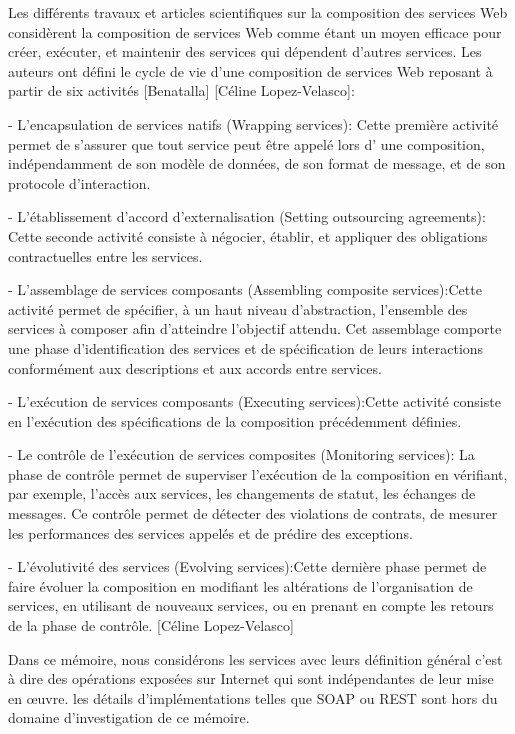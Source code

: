 Les différents travaux et articles scientifiques sur la composition des services Web considèrent la composition de services Web comme étant un moyen efficace 
pour créer, exécuter, et maintenir des services qui dépendent d’autres services. Les auteurs ont défini le cycle de vie d’une composition de services Web reposant à partir de six activités [Benatalla] [Céline Lopez-Velasco]: 

- L’encapsulation de services natifs (Wrapping services): Cette première activité permet de  s’assurer que tout service peut être appelé lors d’ une composition, indépendamment de son  modèle de données, de son format de message, et de son protocole d’interaction. 


- L’établissement d’accord d’externalisation (Setting outsourcing agreements): Cette seconde activité consiste à négocier, établir, et appliquer des obligations contractuelles entre les services.


- L’assemblage de services composants (Assembling composite services):Cette activité permet  de spécifier, à un haut niveau d’abstraction, l’ensemble des services à composer afin d’atteindre  l’objectif attendu. Cet assemblage comporte une phase d’identification des services et de spécification de leurs interactions conformément aux descriptions et aux accords entre services. 


- L’exécution de services composants (Executing services):Cette activité consiste en l’exécution des spécifications de la composition précédemment définies. 


- Le contrôle de l’exécution de services composites (Monitoring services): La phase de contrôle permet de superviser l’exécution de la composition en vérifiant, par exemple, l’accès aux services, les changements de statut, les échanges de messages. Ce contrôle permet de détecter des violations de contrats, de mesurer les performances des services appelés et de prédire des exceptions. 


- L’évolutivité des services (Evolving services):Cette dernière phase permet de faire évoluer la composition en modifiant les altérations de l’organisation de services, en utilisant de nouveaux  services, ou en prenant en compte les retours de la phase de contrôle. 
[Céline Lopez-Velasco]



Dans ce mémoire, nous considérons les services avec leurs définition général c'est à dire des opérations exposées
sur Internet qui sont indépendantes de leur mise en œuvre. les détails d’implémentations telles que SOAP ou REST sont hors du domaine d’investigation de ce mémoire.

